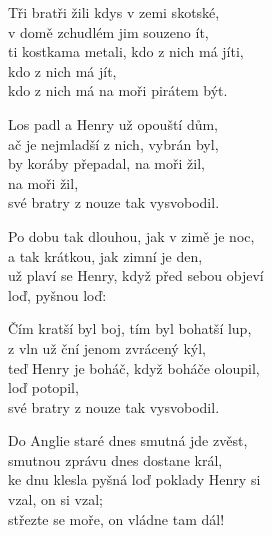 
\ve{}
Tři bratři žili kdys v zemi skotské,\\
v domě zchudlém jim souzeno ít, \quad {}\\
ti kostkama metali, kdo z nich má jíti,\\
kdo z nich má jít, \quad {}\\
kdo z nich má na moři pirátem být.

\ve{}
Los padl a Henry už opouští dům,\\
ač je nejmladší z nich, vybrán byl,\\
by koráby přepadal, na moři žil,\\
na moři žil,\\
své bratry z nouze tak vysvobodil.

\ve{}
Po dobu tak dlouhou, jak v zimě je noc,\\
a tak krátkou, jak zimní je den,\\
už plaví se Henry, když před sebou objeví\\
loď, pyšnou loď:\\

\ve{}
Čím kratší byl boj, tím byl bohatší lup,\\
z vln už ční jenom zvrácený kýl,\\
teď Henry je boháč, když boháče oloupil,\\
loď potopil,\\
své bratry z nouze tak vysvobodil.

\ve{}
Do Anglie staré dnes smutná jde zvěst,\\
smutnou zprávu dnes dostane král,\\
ke dnu klesla pyšná loď poklady Henry si\\
vzal, on si vzal;\\
střezte se moře, on vládne tam dál!

\esong